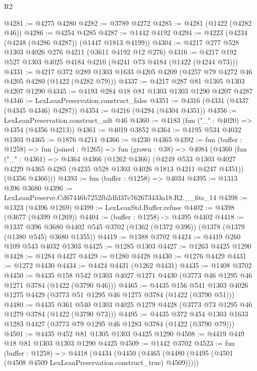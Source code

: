 \begin{lexlean}{R2}
\begin{coremodule}
@4281 := @4275 @4280
@4282 := @3789 @4272
@4285 := @4281 (@1422 (@4282 @46))
@4286 := @4254 @4285
@4287 := @1442 @4192
@4294 := @4223 (@4234 (@4248 (@4286 @4287)) (@1447 @1813 @4199))
@4304 := @4217 @277 @528 @1303 @4026 @276 @4211 (@3611 @4192 @12 @276)
@4316 := @4217 @192 @527 @1303 @4025 @4184 @4210 (@4241 @73 @4184 (@1422 (@4244 @73)))
@4331 := @4217
    @372
    @289
    @1303
    @1633
    @4205
    @4209
    (@4257 @79 @4272 @46 @4205 @4280 (@1422 (@4282 @79)))
@4337 := @4217 @287 @81 @1305 @1303 @4207 @1290
@4345 := @4193 @284 @18 @81 @1303 @1303 @1290 @4207 @4287
@4346 := LexLeanPreservation.construct_false
@4351 := @4316 (@4331 (@4337 (@4345 @4346) @4287))
@4354 := @4216 (@4294 (@4304 @4351))
@4356 := LexLeanPreservation.construct_adt @46
@4360 := @4183 (fun ("_" : @4020) => @4354 (@4356 @4213))
@4361 := @4019 @3852
@4364 := @4195 @534 @4032 @1303
@4365 := @1876 @4211
@4366 := @4230 @4365
@4392 := fun (buffer : @1258) =>
  fun (joined : @1265) =>
  fun (grown : @38) =>
  @4084
    (@4360
      (fun ("_" : @4361) =>
      @4364
        @4366
        (@1262 @4366)
        (@4249 @533 @1303 @4027 @4229 @4365 @4285 (@4235 @528 @1303 @4026 @1813 @4211 @4247 @4351))
        (@4356 @4366)))
@4393 := fun (buffer : @1258) => @4034
@4395 := @1313 @396 @3680
@4396 := LexLeanPreserve.Cd67446b7252fb2dfd37e762673433a18.R2.__fits_14
@4398 := @1323 (@4396 @1269)
@4399 := LexLeanStd.Buffer.refuse
@4402 := @4398 (@3677 (@4399 @1269))
@4404 := (buffer : @1258) -> @4395 @4402
@4418 := @1337
    @396
    @3680
    @4402
    @545
    @3702
    (@1362 (@1372 @396))
    (@1378 (@1379 (@1380 @545) @3680 @1355))
@4419 := @1388 @3702
@4424 := @4419 @260 @109 @543 @4032 @1303
@4425 := @1285 @1303
@4427 := @1263 @4425 @1290
@4428 := @1284 @4427
@4429 := @1280 @4428
@4430 := @1276 @4429
@4431 := @1272 @4430
@4434 := @4424 @4431 (@1262 @4431)
@4435 := @1408 @3702
@4450 := @4435
    @158
    @542
    @1303
    @4027
    @1271
    @4430
    (@3773 @46 @1295 @46 @1271 @3784 (@1422 (@3790 @46)))
@4465 := @4435
    @156
    @541
    @1303
    @4026
    @1275
    @4429
    (@3773 @51 @1295 @46 @1275 @3784 (@1422 (@3790 @51)))
@4480 := @4435
    @361
    @540
    @1303
    @4025
    @1279
    @4428
    (@3773 @73 @1295 @46 @1279 @3784 (@1422 (@3790 @73)))
@4495 := @4435
    @372
    @454
    @1303
    @1633
    @1283
    @4427
    (@3773 @79 @1295 @46 @1283 @3784 (@1422 (@3790 @79)))
@4501 := @4435 @452 @81 @1305 @1303 @4425 @1290
@4508 := @4419 @449 @18 @81 @1303 @1303 @1290 @4425
@4509 := @1442 @3702
@4523 := fun (buffer : @1258) =>
  @4418
    (@4434
      (@4450 (@4465 (@4480 (@4495 (@4501 (@4508 @4509 LexLeanPreservation.construct_true) @4509)))))

\end{coremodule}
\end{lexlean}
